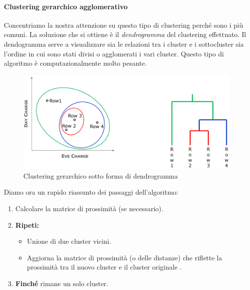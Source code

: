\paragraph{Clustering gerarchico agglomerativo} Concentriamo la nostra attenzione su questo tipo di clustering perché sono i più comuni. 
La soluzione che si ottiene è il \textit{dendrogramma} del clustering effettuato. Il dendogramma serve a visualizzare sia le relazioni tra i cluster e i sottocluster sia l'ordine in cui sono stati divisi o agglomerati i vari cluster. Questo tipo di algoritmo è computazionalmente molto pesante.

\begin{figure}[H]
	\centering
	\includegraphics[height=0.25 \linewidth]{clustering/pict/cluster_aggl.png}
	\caption{Clustering gerarchico sotto forma di dendrogramma}
\end{figure}

Diamo ora un rapido riassunto dei passaggi dell'algoritmo:

\begin{enumerate}
	\item Calcolare la matrice di prossimità (se necessario).
	\item \textbf{Ripeti:}
	\begin{itemize}
		\item Unione di due cluster vicini.
		\item Aggiorna la matrice di prossimità (o delle distanze) che riflette la prossimità tra il nuovo cluster e il cluster originale		.
	\end{itemize}
	\item \textbf{Finché} rimane un solo cluster.
\end{enumerate}

